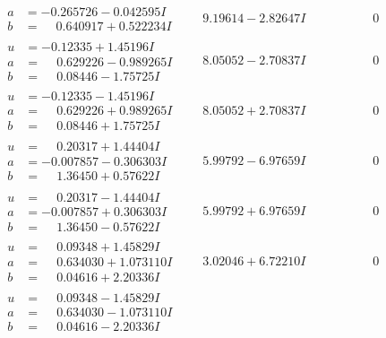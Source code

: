 \documentclass[1p]{elsarticle_modified}
\theoremstyle{definition}
\begin{document}
$$\begin{array}{c|c|c}
\begin{aligned}
a &= -0.265726 - 0.042595 I \\
b &= \phantom{-}0.640917 + 0.522234 I\end{aligned}
 & \phantom{-}9.19614 - 2.82647 I & \phantom{-0.000000 } 0 \\ \hline\begin{aligned}
u &= -0.12335 + 1.45196 I \\
a &= \phantom{-}0.629226 - 0.989265 I \\
b &= \phantom{-}0.08446 - 1.75725 I\end{aligned}
 & \phantom{-}8.05052 - 2.70837 I & \phantom{-0.000000 } 0 \\ \hline\begin{aligned}
u &= -0.12335 - 1.45196 I \\
a &= \phantom{-}0.629226 + 0.989265 I \\
b &= \phantom{-}0.08446 + 1.75725 I\end{aligned}
 & \phantom{-}8.05052 + 2.70837 I & \phantom{-0.000000 } 0 \\ \hline\begin{aligned}
u &= \phantom{-}0.20317 + 1.44404 I \\
a &= -0.007857 - 0.306303 I \\
b &= \phantom{-}1.36450 + 0.57622 I\end{aligned}
 & \phantom{-}5.99792 - 6.97659 I & \phantom{-0.000000 } 0 \\ \hline\begin{aligned}
u &= \phantom{-}0.20317 - 1.44404 I \\
a &= -0.007857 + 0.306303 I \\
b &= \phantom{-}1.36450 - 0.57622 I\end{aligned}
 & \phantom{-}5.99792 + 6.97659 I & \phantom{-0.000000 } 0 \\ \hline\begin{aligned}
u &= \phantom{-}0.09348 + 1.45829 I \\
a &= \phantom{-}0.634030 + 1.073110 I \\
b &= \phantom{-}0.04616 + 2.20336 I\end{aligned}
 & \phantom{-}3.02046 + 6.72210 I & \phantom{-0.000000 } 0 \\ \hline\begin{aligned}
u &= \phantom{-}0.09348 - 1.45829 I \\
a &= \phantom{-}0.634030 - 1.073110 I \\
b &= \phantom{-}0.04616 - 2.20336 I\end{aligned}

\end{array}$$
\end{document}
